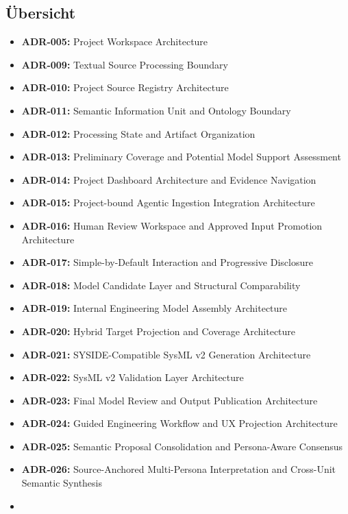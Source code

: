 \hypertarget{uxfcbersicht}{%
\subsection{Übersicht}\label{uxfcbersicht}}

\begin{itemize}
\item
  \textbf{ADR-005:} Project Workspace Architecture
\item
  \textbf{ADR-009:} Textual Source Processing Boundary
\item
  \textbf{ADR-010:} Project Source Registry Architecture
\item
  \textbf{ADR-011:} Semantic Information Unit and Ontology Boundary
\item
  \textbf{ADR-012:} Processing State and Artifact Organization
\item
  \textbf{ADR-013:} Preliminary Coverage and Potential Model Support Assessment
\item
  \textbf{ADR-014:} Project Dashboard Architecture and Evidence Navigation
\item
  \textbf{ADR-015:} Project-bound Agentic Ingestion Integration Architecture
\item
  \textbf{ADR-016:} Human Review Workspace and Approved Input Promotion Architecture
\item
  \textbf{ADR-017:} Simple-by-Default Interaction and Progressive Disclosure
\item
  \textbf{ADR-018:} Model Candidate Layer and Structural Comparability
\item
  \textbf{ADR-019:} Internal Engineering Model Assembly Architecture
\item
  \textbf{ADR-020:} Hybrid Target Projection and Coverage Architecture
\item
  \textbf{ADR-021:} SYSIDE-Compatible SysML v2 Generation Architecture
\item
  \textbf{ADR-022:} SysML v2 Validation Layer Architecture
\item
  \textbf{ADR-023:} Final Model Review and Output Publication Architecture
\item
  \textbf{ADR-024:} Guided Engineering Workflow and UX Projection Architecture
\item
  \textbf{ADR-025:} Semantic Proposal Consolidation and Persona-Aware Consensus
\item
  \textbf{ADR-026:} Source-Anchored Multi-Persona Interpretation and Cross-Unit Semantic Synthesis
\item

\end{itemize}

